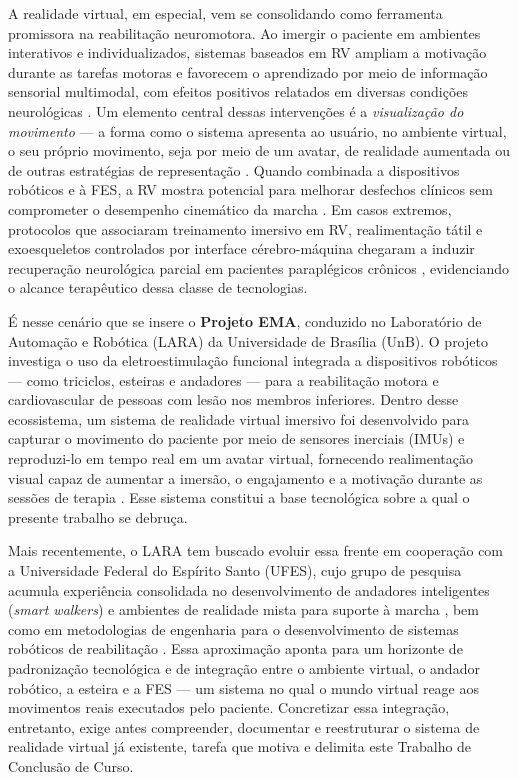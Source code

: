 A realidade virtual, em especial, vem se consolidando como ferramenta promissora na
reabilitação neuromotora. Ao imergir o paciente em ambientes interativos e
individualizados, sistemas baseados em RV ampliam a motivação durante as tarefas
motoras e favorecem o aprendizado por meio de informação sensorial multimodal, com
efeitos positivos relatados em diversas condições neurológicas
\cite{macchitella2023,ferreiradossantos2016}. Um elemento central dessas intervenções
é a \emph{visualização do movimento} --- a forma como o sistema apresenta ao usuário,
no ambiente virtual, o seu próprio movimento, seja por meio de um avatar, de realidade
aumentada ou de outras estratégias de representação \cite{ferreiradossantos2016}. Quando
combinada a dispositivos robóticos e à FES, a RV mostra potencial para melhorar
desfechos clínicos sem comprometer o desempenho cinemático da marcha
\cite{loureiro2024}. Em casos extremos, protocolos que associaram treinamento imersivo
em RV, realimentação tátil e exoesqueletos controlados por interface cérebro-máquina
chegaram a induzir recuperação neurológica parcial em pacientes paraplégicos crônicos
\cite{donati2016}, evidenciando o alcance terapêutico dessa classe de tecnologias.

É nesse cenário que se insere o \textbf{Projeto EMA}, conduzido no Laboratório de
Automação e Robótica (LARA) da Universidade de Brasília (UnB). O projeto investiga o uso
da eletroestimulação funcional integrada a dispositivos robóticos --- como triciclos,
esteiras e andadores --- para a reabilitação motora e cardiovascular de pessoas com
lesão nos membros inferiores. Dentro desse ecossistema, um sistema de realidade virtual
imersivo foi desenvolvido para capturar o movimento do paciente por meio de sensores
inerciais (IMUs) e reproduzi-lo em tempo real em um avatar virtual, fornecendo
realimentação visual capaz de aumentar a imersão, o engajamento e a motivação durante
as sessões de terapia \cite{balbino2020}. Esse sistema constitui a base tecnológica
sobre a qual o presente trabalho se debruça.

Mais recentemente, o LARA tem buscado evoluir essa frente em cooperação com a
Universidade Federal do Espírito Santo (UFES), cujo grupo de pesquisa acumula
experiência consolidada no desenvolvimento de andadores inteligentes (\emph{smart
walkers}) e ambientes de realidade mista para suporte à marcha
\cite{machado2024,loureiro2024}, bem como em metodologias de engenharia para o
desenvolvimento de sistemas robóticos de reabilitação \cite{bezerra2025}. Essa
aproximação aponta para um horizonte de padronização tecnológica e de integração entre
o ambiente virtual, o andador robótico, a esteira e a FES --- um sistema no qual o
mundo virtual reage aos movimentos reais executados pelo paciente. Concretizar essa
integração, entretanto, exige antes compreender, documentar e reestruturar o sistema de
realidade virtual já existente, tarefa que motiva e delimita este Trabalho de Conclusão
de Curso.


